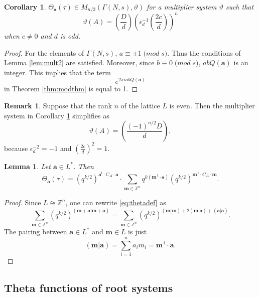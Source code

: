 \documentclass{article}
\newtheorem{lemma}[theorem]{Lemma}
\newtheorem{corollary}[theorem]{Corollary}
\theoremstyle{definition}
\newtheorem{remark}[theorem]{Remark}
\newcommand{\ZZ} {{\mathbb Z}}		%
\renewcommand{\top}{\,\mathsf{t}}
\begin{document}
\begin{corollary}
\label{cor:mult3} 
$\Theta_{\mathbf{a}}(\tau) \in M_{n/2}(\Gamma(N,s), \vartheta)$
for a multiplier system $\vartheta$ such that
\[ \vartheta(A)= \left(\frac{D}{d}\right)\left(\epsilon^{-1}_d 
\left(\frac{2c}{d}\right)\right)^n \]
when $c \neq 0$ and $d$ is odd.
\end{corollary}
\begin{proof}
For the elements of $\Gamma(N,s)$, $a \equiv \pm 1 \; \mathrm(mod\; s)$. Thus the conditions 
of Lemma \ref{lem:mult2} are satisfied. Moreover, since $b \equiv 0 \; \mathrm(mod\; s)$, 
$ab Q(\mathbf{a})$ is an integer. This implies that the term 
\[ e^{2 \pi i ab Q(\mathbf{a})} \]
in Theorem \ref{thm:modthm} is equal to 1.
\end{proof}

\begin{remark} 
\label{rmk:multsyseven}	
Suppose that the rank $n$ of the lattice $L$ is even.
Then the multiplier system in Corollary \ref{cor:mult3} simplifies as
\[ \vartheta(A)= \left( \frac{(-1)^{n/2} D}{d} \right), \]
because	$\epsilon_d^{-2}=-1$ and $\left( \frac{2c}{d}\right)^2=1$.
\end{remark}

\begin{lemma} Let $\mathbf{a} \in L^{\ast}$. Then
	\[
	\Theta_{\mathbf{a}}(\tau)= {(q^{k/2})^{\mathbf{a}^{t} \cdot C_\Delta \cdot \mathbf{a}}}
	\cdot \sum_{ \mathbf{m} \in  \ZZ^n } {q^{ k({\mathbf{m}^ {\top}} \cdot 
			\mathbf{a})
	}} {(q^{k/2})^{{\mathbf{m}^ {\top}} \cdot C_\Delta \cdot \mathbf{m}}}.\]
	\label{lem:thetadef2}
\end{lemma}
\begin{proof}
	Since $L \cong  \ZZ^n $, one can rewrite \eqref{eq:thetadef}
	as
	\[ \sum_{\mathbf{m} \in  \ZZ^n} (q^{k/2})^{(\mathbf{m+\mathbf{a}} | 
		\mathbf{m+\mathbf{a}})} =
	\sum_{\mathbf{m} \in  \ZZ^n} (q^{k/2})^{(\mathbf{m}|
		\mathbf{m})+2(\mathbf{m}|\mathbf{a})+(\mathbf{a}|\mathbf{a})} 
	.
	\]
	The pairing between $\mathbf{a} \in L^{\ast}$ and $\mathbf{m} \in L$ is just
	\[(\mathbf{m}|\mathbf{a})=\sum_{i=1}^n a_i m_i = \mathbf{m}^ {\top} \cdot \mathbf{a}.\]
\end{proof}

\subsection{Theta functions of root systems}

\end{document}
